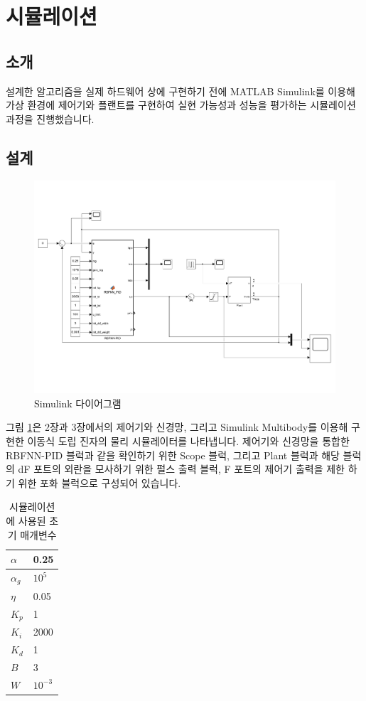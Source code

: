 \section{시뮬레이션}
\subsection{소개}
설계한 알고리즘을 실제 하드웨어 상에 구현하기 전에 MATLAB Simulink를 이용해 가상 환경에 제어기와 플랜트를 구현하여 실현 가능성과 성능을 평가하는 시뮬레이션 과정을 진행했습니다.
%
\subsection{설계}
%
\begin{figure}[h]
    \centering
    \includegraphics[width=\textwidth,trim={0 3cm 0 3cm},clip]{figures/upper.pdf}
    \caption{Simulink 다이어그램}
    \label{fig:simulink_diagram}
\end{figure}
%
그림 \ref{fig:simulink_diagram}은 2장과 3장에서의 제어기와 신경망, 그리고 Simulink Multibody를 이용해 구현한 이동식 도립 진자의 물리 시뮬레이터를 나타냅니다. 제어기와 신경망을 통합한 RBFNN-PID 블럭과 같을 확인하기 위한 Scope 블럭, 그리고 Plant 블럭과 해당 블럭의 dF 포트의 외란을 모사하기 위한 펄스 출력 블럭, F 포트의 제어기 출력을 제한 하기 위한 포화 블럭으로 구성되어 있습니다.  
%
\begin{table}[h!]
\centering
\begin{tabularx}{5cm}{|C|C|}
 \hline
 $\alpha$ & 0.25 \\ 
 \hline
 $\alpha_{g}$ & $10^5$ \\
 \hline
 $\eta$ & 0.05 \\ 
 \hline
 $K_{p}$ & 1 \\ 
 \hline
 $K_{i}$ & 2000 \\ 
 \hline
 $K_{d}$ & 1 \\
 \hline
 $B$ & 3 \\
 \hline
 $W$ & $10^{-3}$ \\
 \hline
\end{tabularx}
\caption{시뮬레이션에 사용된 초기 매개변수}
\end{table}
